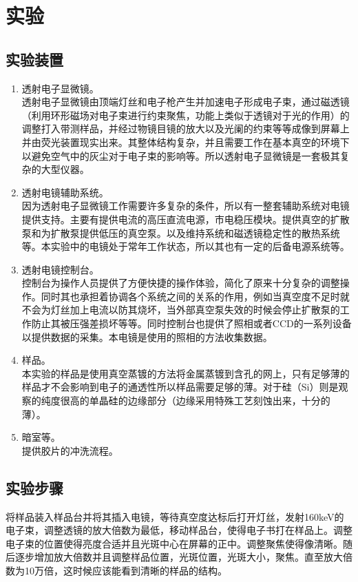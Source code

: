 \documentclass[aps,pre,12pt,preprint,onecolumn,showpacs,showkeys,UTF8]{revtex4-1}
\begin{document}
\section{实验}
\subsection{实验装置}
\begin{enumerate}
	\item 透射电子显微镜。\\透射电子显微镜由顶端灯丝和电子枪产生并加速电子形成电子束，通过磁透镜（利用环形磁场对电子束进行约束聚焦，功能上类似于透镜对于光的作用）的调整打入带测样品，并经过物镜目镜的放大以及光阑的约束等等成像到屏幕上并由荧光装置现实出来。其整体结构复杂，并且需要工作在基本真空的环境下以避免空气中的灰尘对于电子束的影响等。所以透射电子显微镜是一套极其复杂的大型仪器。
	\item 透射电镜辅助系统。\\ 因为透射电子显微镜工作需要许多复杂的条件，所以有一整套辅助系统对电镜提供支持。主要有提供电流的高压直流电源，市电稳压模块。提供真空的扩散泵和为扩散泵提供低压的真空泵。以及维持系统和磁透镜稳定性的散热系统等。本实验中的电镜处于常年工作状态，所以其也有一定的后备电源系统等。
	\item 透射电镜控制台。\\控制台为操作人员提供了方便快捷的操作体验，简化了原来十分复杂的调整操作。同时其也承担着协调各个系统之间的关系的作用，例如当真空度不足时就不会为灯丝加上电流以防其烧坏，当外部真空泵失效的时候会停止扩散泵的工作防止其被压强差损坏等等。同时控制台也提供了照相或者CCD的一系列设备以提供数据的采集。本电镜是使用的照相的方法收集数据。
	\item 样品。\\本实验的样品是使用真空蒸镀的方法将金属蒸镀到含孔的网上，只有足够薄的样品才不会影响到电子的通透性所以样品需要足够的薄。对于硅（Si）则是观察的纯度很高的单晶硅的边缘部分（边缘采用特殊工艺刻蚀出来，十分的薄）。
	\item 暗室等。\\提供胶片的冲洗流程。
\end{enumerate}

\subsection{实验步骤}

将样品装入样品台并将其插入电镜，等待真空度达标后打开灯丝，发射160keV的电子束，调整透镜的放大倍数为最低，移动样品台，使得电子书打在样品上。调整电子束的位置使得亮度合适并且光斑中心在屏幕的正中。调整聚焦使得像清晰。随后逐步增加放大倍数并且调整样品位置，光斑位置，光斑大小，聚焦。直至放大倍数为10万倍，这时候应该能看到清晰的样品的结构。
\end{document}
